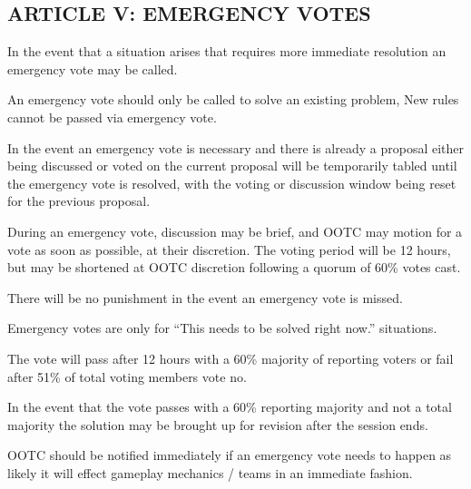 \subsection{ARTICLE V: EMERGENCY VOTES}
\begin{deepEnumerate}
    \item In the event that a situation arises that requires more immediate resolution an emergency vote may be called.
    \begin{deepEnumerate}
        \item An emergency vote should only be called to solve an existing problem, New rules cannot be passed via emergency vote.
        \item In the event an emergency vote is necessary and there is already a proposal either being discussed or voted on the current proposal will be temporarily
        tabled until the emergency vote is resolved, with the voting or discussion window being reset for the previous proposal.
        \item During an emergency vote, discussion may be brief, and OOTC may motion for a vote as soon as possible, at their discretion. 
        The voting period will be 12 hours, but may be shortened at OOTC discretion following a quorum of 60\% votes cast.
        \begin{deepEnumerate}
            \item There will be no punishment in the event an emergency vote is missed.
        \end{deepEnumerate}
        \item Emergency votes are only for  “This needs to be solved right now.” situations.
        \begin{deepEnumerate}
            \item The vote will pass after 12 hours with a 60\% majority of reporting voters or fail after 51\% of total voting members vote no.
            \item In the event that the vote passes with a 60\% reporting majority and not a total majority the solution may be brought up for revision after the session ends.
        \end{deepEnumerate}
        \item OOTC should be notified immediately if an emergency vote needs to happen as likely it will effect gameplay mechanics / teams in an immediate fashion.
    \end{deepEnumerate}
\end{deepEnumerate}

